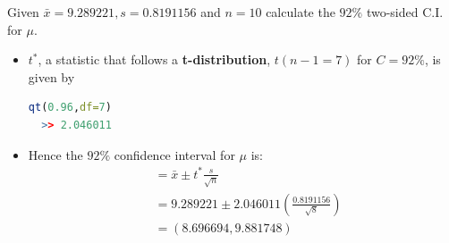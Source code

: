 \documentclass[boxes, qed]{homework}
\begin{document}
\begin{problem}Given $\bar{x}=9.289221, s=0.8191156$ and $n=10$
  calculate the $92\%$ two-sided C.I. for $\mu$.
\end{problem}
\begin{solution}\begin{itemize}
  \item $t^*$, a statistic that follows a \textbf{t-distribution}, $t(n-1=7)$ 
  for $C=92\%$, is given by
  \begin{lstlisting}[backgroundcolor = \color{lightgray},language = R]
  qt(0.96,df=7)
  >> 2.046011
  \end{lstlisting}
  \item Hence the $92\%$ confidence interval for $\mu$ is:
    \begin{align*}
      &= \bar{x} \pm t^*\frac{s}{\sqrt{n}}\\
      &= 9.289221 \pm 2.046011 (\frac{0.8191156}{\sqrt{8}})\\
      &= ( 8.696694, 9.881748)
    \end{align*}
\end{itemize}
\end{solution}
\end{document}
